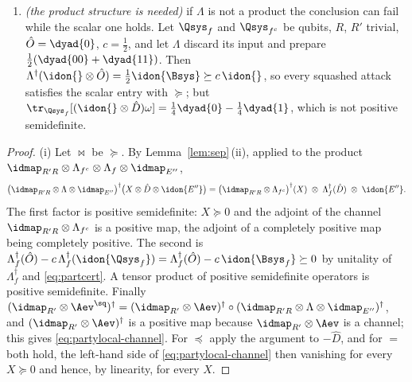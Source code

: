 \begin{lemma}
\begin{enumerate}[label=(\roman*),leftmargin=2.2em]
reads $\tr_{\Qsys}[(\idon{A}\otimes\hat O)\omega]\bowtie c\,\omega_A$.
\item \emph{(the product structure is needed)} if $\Lambda$ is not a product
the conclusion can fail while the scalar one holds. Let $\Qsys_f$ and
$\Qsys_{f^c}$ be qubits, $R$, $R'$ trivial, $\hat O=\dyad{0}$, $c=\tfrac12$,
and let $\Lambda$ discard its input and prepare
$\tfrac12(\dyad{00}+\dyad{11})$. Then
$\Lambda^{\dagger}(\idon{}\otimes\hat O)=\tfrac12\idon{\Bsys}\succeq c\,\idon{}$,
so every squashed attack satisfies the scalar entry with $\succeq$; but
$\tr_{\Qsys_f}[(\idon{}\otimes\hat D)\omega]
=\tfrac14\dyad{0}-\tfrac14\dyad{1}$, which is not positive semidefinite.
\end{enumerate}
\end{lemma}

\begin{proof}
(i) Let $\bowtie$ be $\succeq$. By Lemma~\ref{lem:sep}\,(ii), applied to the
product $\idmap_{R'R}\otimes\Lambda_{f^c}\otimes\Lambda_f\otimes\idmap_{E''}$,
\begin{equation*}
  \big(\idmap_{R'R}\otimes\Lambda\otimes\idmap_{E''}\big)^{\dagger}
  \big(X\otimes\hat D\otimes\idon{E''}\big)
  =\big(\idmap_{R'R}\otimes\Lambda_{f^c}\big)^{\dagger}(X)\;\otimes\;
   \Lambda_f^{\dagger}(\hat D)\;\otimes\;\idon{E''} .
\end{equation*}
The first factor is positive semidefinite: $X\succeq0$ and the adjoint of
the channel $\idmap_{R'R}\otimes\Lambda_{f^c}$ is a positive map, the
adjoint of a completely positive map being completely positive. The second
is $\Lambda_f^{\dagger}(\hat O)-c\,\Lambda_f^{\dagger}(\idon{\Qsys_f})
=\Lambda_f^{\dagger}(\hat O)-c\,\idon{\Bsys_f}\succeq0$ by unitality of
$\Lambda_f^{\dagger}$ and \eqref{eq:partcert}. A tensor product of positive
semidefinite operators is positive semidefinite. Finally
$(\idmap_{R'}\otimes\Aev^{\sq})^{\dagger}
=(\idmap_{R'}\otimes\Aev)^{\dagger}\circ
(\idmap_{R'R}\otimes\Lambda\otimes\idmap_{E''})^{\dagger}$, and
$(\idmap_{R'}\otimes\Aev)^{\dagger}$ is a positive map because
$\idmap_{R'}\otimes\Aev$ is a channel; this gives
\eqref{eq:partylocal-channel}. For $\preceq$ apply the argument to
$-\hat D$, and for $=$ both hold, the left-hand side of
\eqref{eq:partylocal-channel} then vanishing for every $X\succeq0$ and
hence, by linearity, for every $X$.


\end{proof}
